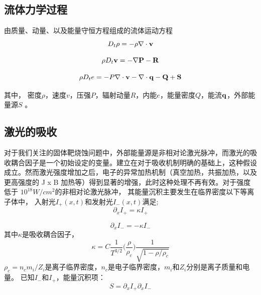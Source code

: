 \subsection{流体力学过程}
由质量、动量、以及能量守恒方程组成的流体运动方程
\begin{equation}
\label{eqn:massCon}
D_t \rho = - \rho \nabla \cdot \bf{v}
\end{equation} 

\begin{equation}
\label{eqn:momentumCon}
\rho D_t \bf{v} = - \nabla P - \bf{R}
\end{equation} 

\begin{equation}
\label{eqn:energyCon}
\rho D_t e = -P \nabla \cdot \bf{v} - \nabla \cdot \bf{q} -Q +S
\end{equation} 

其中， 密度$\rho$，速度$v$，压强$P$，辐射动量$R$，内能$e$，能量密度$Q$，能流$\bf{q}$，外部能量源$S$ 。


\subsection{激光的吸收}
对于我们关注的固体靶烧蚀问题中，外部能量源是非相对论激光脉冲，而激光的吸收耦合因子是一个初始设定的变量。建立在对于吸收机制明确的基础上，这种假设成立。然而激光强度增加之后，电子的异常加热机制（真空加热，共振加热，以及更高强度的 J x B 加热等）得到显著的增强，此时这种处理不再有效。对于强度低于 $10^18 W/cm^2$的非相对论激光脉冲，
其能量沉积主要发生在临界密度以下等离子体中，
入射光$I_{+}(x,t)$和发射光$I_{-}(x,t)$满足;
\begin{equation}
\label{eqn:incidentLaser}
\partial_x I_{+}= \kappa I_{+}
\end{equation} 

\begin{equation}
\label{eqn:reflectLaser}
\partial_x I_{-}= -\kappa I_{-}
\end{equation} 
其中$\kappa$是吸收耦合因子，
\begin{equation}
\label{eqn:Kappa}
\kappa =C \frac{1}{T^{3/2}} \bigl( \frac{\rho}{\rho_c}  \bigr) \frac{1}{\sqrt{1-\rho/ \rho_c}}
\end{equation} 
$\rho_c=n_c m_i / Z_i$是离子临界密度，$n_c$是电子临界密度，$m_i$和$Z_i$分别是离子质量和电量。
已知$I_-$和$I_+$，能量沉积项：
\begin{equation}
\label{eqn:energyDeposition}
S=\partial_x I_+ \partial_x I_-
\end{equation} 

